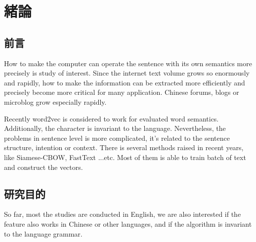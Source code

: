 \chapter{緒論}
\setlength{\baselineskip}{1.5em}
\setlength{\parindent}{2em}
\setlength{\parskip}{1em}

\section{前言}

How to make the computer can operate the sentence with its own semantics more precisely is study of interest. Since the internet text volume grows so enormously and rapidly, how to make the information can be extracted more efficiently and precisely become more critical for many application. Chinese forums, blogs or microblog grow especially rapidly.    

Recently word2vec is considered to work for evaluated word semantics.  Additionally, the character is invariant to the language. Nevertheless, the problems in sentence level is more complicated, it's related to the sentence structure,  intention or context. There is several methods raised in recent years, like Siamese-CBOW, FastText ...etc. Most of them is able to train batch of text and construct the vectors.

\section{研究目的}

So far, most the studies are conducted in English, we are also interested if the feature also works in Chinese or other languages, and if the algorithm is invariant to the language grammar.